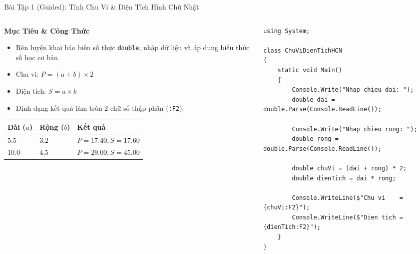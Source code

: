 \documentclass[aspectratio=169, 10pt]{beamer}
\begin{document}
\begin{frame}[fragile]{Bài Tập 1 (Guided): Tính Chu Vi \& Diện Tích Hình Chữ Nhật}
  \begin{columns}[T]
    \begin{column}{0.45\textwidth}
      \begin{block}{\textbf{Mục Tiêu \& Công Thức}}
        \begin{itemize}
          \item Rèn luyện khai báo biến số thực \texttt{double}, nhập dữ liệu và áp dụng biểu thức số học cơ bản.
          \item Chu vi: $P = (a + b) \times 2$
          \item Diện tích: $S = a \times b$
          \item Định dạng kết quả làm tròn 2 chữ số thập phân (\texttt{:F2}).
        \end{itemize}
      \end{block}
      \begin{table}[h]
        \centering
        \scriptsize
        \begin{tabularx}{\textwidth}{XXX}
          \toprule
          \textbf{Dài ($a$)} & \textbf{Rộng ($b$)} & \textbf{Kết quả} \\
          \midrule
          $5.5$ & $3.2$ & $P = 17.40, S = 17.60$ \\
          $10.0$ & $4.5$ & $P = 29.00, S = 45.00$ \\
          \bottomrule
        \end{tabularx}
      \end{table}
    \end{column}
    \begin{column}{0.53\textwidth}
\begin{lstlisting}
using System;

class ChuViDienTichHCN
{
    static void Main()
    {
        Console.Write("Nhap chieu dai: ");
        double dai = double.Parse(Console.ReadLine());

        Console.Write("Nhap chieu rong: ");
        double rong = double.Parse(Console.ReadLine());

        double chuVi = (dai + rong) * 2;
        double dienTich = dai * rong;

        Console.WriteLine($"Chu vi    = {chuVi:F2}");
        Console.WriteLine($"Dien tich = {dienTich:F2}");
    }
}
\end{lstlisting}
    \end{column}
  \end{columns}
\end{frame}
\end{document}
